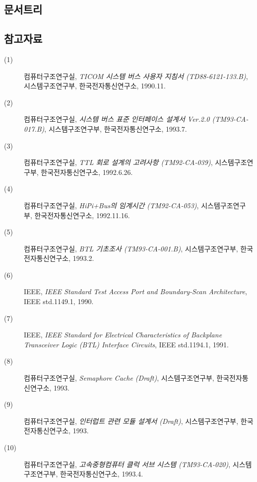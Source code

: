 \subsection{문서트리}

\subsection{참고자료}
\begin{description}
  \item[(1)] 컴퓨터구조연구실, {\em TICOM 시스템 버스 사용자 지침서 (TD88-6121-133.B)},
	시스템구조연구부, 한국전자통신연구소, 1990.11.
  \item[(2)] 컴퓨터구조연구실, {\em 시스템 버스 표준 인터페이스 설계서 Ver.2.0 (TM93-CA-017.B)},
	시스템구조연구부, 한국전자통신연구소, 1993.7.
  \item[(3)] 컴퓨터구조연구실, {\em TTL 회로 설계의 고려사항 (TM92-CA-039)},
	시스템구조연구부, 한국전자통신연구소, 1992.6.26.
  \item[(4)] 컴퓨터구조연구실, {\em HiPi+Bus의 임계시간 (TM92-CA-053)},
	시스템구조연구부, 한국전자통신연구소, 1992.11.16.
  \item[(5)] 컴퓨터구조연구실, {\em BTL 기초조사 (TM93-CA-001.B)},
	시스템구조연구부, 한국전자통신연구소, 1993.2.
  \item[(6)] IEEE, {\em IEEE Standard Test Access Port
	and Boundary-Scan Architecture}, IEEE std.1149.1, 1990.
  \item[(7)] IEEE, {\em IEEE Standard for Electrical Characteristics of
	Backplane Transceiver Logic (BTL) Interface Circuits},
	IEEE std.1194.1, 1991.
  \item[(8)] 컴퓨터구조연구실, {\em Semaphore Cache {\it (Draft)\/}},
	시스템구조연구부, 한국전자통신연구소, 1993.
  \item[(9)] 컴퓨터구조연구실, {\em 인터럽트 관련 모듈 설계서 {\it (Draft)\/}},
	시스템구조연구부, 한국전자통신연구소, 1993.
  \item[(10)] 컴퓨터구조연구실, {\em 고속중형컴퓨터 클럭 서브 시스템 (TM93-CA-020)},
	시스템구조연구부, 한국전자통신연구소, 1993.4.
\end{description}
%

